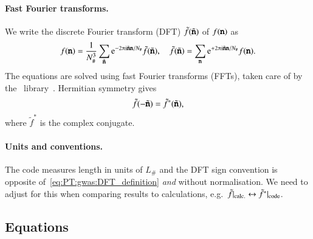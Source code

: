 

\paragraph{Fast Fourier transforms.} %
We write the discrete Fourier transform (DFT) $\tilde{f}(\tilde{\boldsymbol{\mathtt{n}}})$ of $f(\boldsymbol{\mathtt{n}})$ as
\begin{equation}\label{eq:PT:gwas:DFT_definition}
    f(\lcoordx) = \frac{1}{N_\#^3} \sum_{\lcoordk } \eu[-2\ppi \im \lcoordk \lcoordx/N_\# ]\tilde{f}(\lcoordk) , \quad \tilde{f}(\lcoordk) = \sum_{\lcoordx} \eu[+2\ppi \im \lcoordk \lcoordx/N_\#  ]f(\lcoordx).
\end{equation}
The equations are solved using fast Fourier transforms (FFTs), taken care of by the~\latfield{} library~\citep{daverioLatfield2LibraryClassical2016}. Hermitian symmetry gives
\begin{equation}
    \tilde{f}(-\tilde{\boldsymbol{\mathtt{n}}}) =  \tilde{f}^\ast(\tilde{\boldsymbol{\mathtt{n}}}),
\end{equation}
where $\tilde{f}^\ast$ is the complex conjugate. 


\paragraph{Units and conventions.} %
The code measures length in units of $L_\#$ and the DFT sign convention is opposite of~\cref{eq:PT:gwas:DFT_definition} \emph{and} without normalisation. We need to adjust for this when comparing results to calculations, e.g.~$\tilde{f}\rvert_\mathrm{calc.} \leftrightarrow \tilde{f}^\ast\rvert_\mathrm{code}$.





\subsection{Equations}

